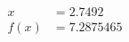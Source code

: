 \documentclass[preview]{standalone}
\begin{document}
\begin{align*}
x &= 2.7492\\f(x) &= 7.2875465
\end{align*}
\end{document}
